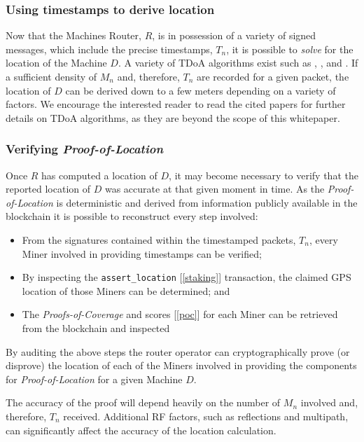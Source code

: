 \documentclass[10pt, nonatbib, nocopyrightspace, reprint]{sigplanconf}
\newcommand{\secref}[1]{[\autoref{#1}]}
\begin{document}
\subsubsection{Using timestamps to derive location}

Now that the Machines Router, $R$, is in possession of a variety of signed messages, which include the precise timestamps, $T_n$, it is possible to \emph{solve} for the location of the Machine $D$. A variety of TDoA algorithms exist such as \cite{recurrent-tdoa}, \cite{acoustic-tdoa}, \cite{efficient-tdoa} and \cite{async-tdoa}. If a sufficient density of $M_n$ and, therefore, $T_n$ are recorded for a given packet, the location of $D$ can be derived down to a few meters depending on a variety of factors. We encourage the interested reader to read the cited papers for further details on TDoA algorithms, as they are beyond the scope of this whitepaper.

\subsubsection{Verifying \emph{Proof-of-Location}}

Once $R$ has computed a location of $D$, it may become necessary to verify that the reported location of $D$ was accurate at that given moment in time. As the \emph{Proof-of-Location} is deterministic and derived from information publicly available in the blockchain it is possible to reconstruct every step involved:

\begin{itemize}
  \item From the signatures contained within the timestamped packets, $T_n$, every Miner involved in providing timestamps can be verified;
  \item By inspecting the \verb|assert_location| \secref{staking} transaction, the claimed GPS location of those Miners can be determined; and
  \item The \emph{Proofs-of-Coverage} and scores \secref{poc} for each Miner can be retrieved from the blockchain and inspected
\end{itemize}

By auditing the above steps the router operator can cryptographically prove (or disprove) the location of each of the Miners involved in providing the components for \emph{Proof-of-Location} for a given Machine $D$.

The accuracy of the proof will depend heavily on the number of $M_n$ involved and, therefore, $T_n$ received. Additional RF factors, such as reflections and multipath, can significantly affect the accuracy of the location calculation.
\end{document}
